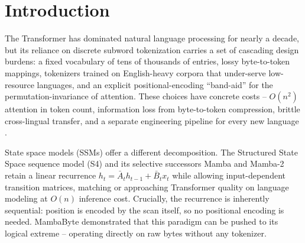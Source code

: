 \documentclass[11pt]{article}
\newcommand{\Stream}{\texttt{Stream}}
\newcommand{\StreamR}{\texttt{StreamR}}
\newcommand{\StreamD}{\texttt{StreamD}}
\newcommand{\Vector}{{\scshape Vector}}
\begin{document}
\begin{abstract}
We also report three extensions and their honest negative/blocked results:
\Vector{}, which augments \Stream{} with a learned saliency-gate for position
pruning, grouped-query attention, and mixture-of-experts layers under a
five-term loss, whose gate collapses to ``keep everything'' ($\text{active ratio}\equiv1.0$)
-- a diagnosed and fixable optimization-landscape failure, not an architectural
dead end; \Stream{}-MoE, a sparse mixture-of-experts variant with
gradient-aware expert lifecycle management, where automatic expert replacement
currently \emph{hurts} validation loss (2.35 vs.\ 2.19) because gradient-based
impact is too noisy in early layers; and \StreamR{}, a \Stream{} whose last SSM
blocks are replaced by sparse-retrieval attention (sliding-window $+$ static
global tokens, $O(n)$ memory) targeting content-based recall, whose 4-layer
pilot matches \Stream{} at short context and whose long-context verdict is
pending at submission; with a pure-recurrence counterpart, \StreamD{}
(Section~\ref{sec:streamd}), whose content-addressed delta matrices are the
bounded-attention-free hypothesis for the same verdict. All code, configs,
and scripts for reproducing every
table and figure are released; the full reproducibility playbook is included in
Section~\ref{sec:repro}.
\end{abstract}

\section{Introduction}\label{sec:intro}

The Transformer \cite{Vaswani2017Attention} has dominated natural language
processing for nearly a decade, but its reliance on discrete subword
tokenization carries a set of cascading design burdens: a fixed vocabulary of
tens of thousands of entries, lossy byte-to-token mappings, tokenizers trained
on English-heavy corpora that under-serve low-resource languages, and an
explicit positional-encoding ``band-aid'' for the permutation-invariance of
attention. These choices have concrete costs -- $O(n^2)$ attention in token
count, information loss from byte-to-token compression, brittle cross-lingual
transfer, and a separate engineering pipeline for every new language
\cite{Xue2021ByT5,Clark2022CANINE}.

State space models (SSMs) offer a different decomposition. The Structured State
Space sequence model (S4) \cite{Gu2021S4} and its selective successors Mamba
\cite{GuDao2023Mamba} and Mamba-2 \cite{DaoGu2024Mamba2} retain a linear
recurrence $h_t=\bar A_t h_{t-1}+\bar B_t x_t$ while allowing input-dependent
transition matrices, matching or approaching Transformer quality on language
modeling at $O(n)$ inference cost. Crucially, the recurrence is inherently
sequential: position is encoded by the scan itself, so no positional encoding is
needed. MambaByte \cite{Wang2024MambaByte} demonstrated that this paradigm can
be pushed to its logical extreme -- operating directly on raw bytes without any
tokenizer.
\end{document}
